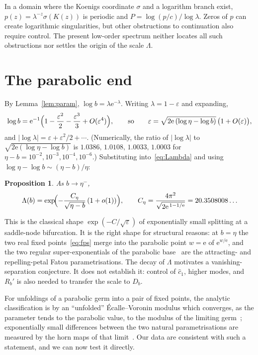 \documentclass[11pt,a4paper]{article}
\newtheorem{proposition}[theorem]{Proposition}
\theoremstyle{definition}
\newcommand{\Rr}{R}
\newcommand{\Kk}{K}
\newcommand{\eee}{\mathrm{e}}
\begin{document}
In a domain where the Koenigs coordinate $\sigma$ and a logarithm branch
exist, $p(z)=\lambda^{-z}\sigma(\Kk(z))$ is periodic and
$P=\log(p/c)/\log\lambda$.  Zeros of $p$ can create logarithmic
singularities, but other obstructions to continuation also require control.
The present low-order spectrum neither locates all such obstructions nor
settles the origin of the scale $\Lambda$.

\section{The parabolic end}\label{sec:parabolic}

By Lemma~\ref{lem:param}, $\log b=\lambda\eee^{-\lambda}$.  Writing
$\lambda=1-\varepsilon$ and expanding,
\[
  \log b=\eee^{-1}\Bigl(1-\frac{\varepsilon^{2}}{2}-\frac{\varepsilon^{3}}{3}
  +O(\varepsilon^{4})\Bigr),
  \qquad\text{so}\qquad
  \varepsilon=\sqrt{2\eee\,(\log\eta-\log b)}\,\bigl(1+O(\varepsilon)\bigr),
\]
and $|\log\lambda|=\varepsilon+\varepsilon^{2}/2+\cdots$.  (Numerically, the
ratio of $|\log\lambda|$ to $\sqrt{2\eee(\log\eta-\log b)}$ is
$1.0386,\,1.0108,\,1.0033,\,1.0003$ for
$\eta-b=10^{-2},10^{-3},10^{-4},10^{-6}$.)  Substituting into~\eqref{eq:Lambda}
and using $\log\eta-\log b\sim(\eta-b)/\eta$:

\begin{proposition}\label{prop:saddle}
As $b\to\eta^{-}$,
\begin{equation}\label{eq:saddle}
  \Lambda(b)=\exp\!\Bigl(-\frac{C_\eta}{\sqrt{\eta-b}}\,(1+o(1))\Bigr),
  \qquad
  C_\eta=\frac{4\pi^{2}}{\sqrt{2\eee^{\,1-1/\eee}}}=20.3508008\ldots
\end{equation}
\end{proposition}

This is the classical shape $\exp(-C/\sqrt{\varepsilon})$ of exponentially small
splitting at a saddle-node bifurcation.  It is the right shape for structural
reasons: at $b=\eta$ the two real fixed points~\eqref{eq:fps} merge into the
parabolic point $w=\eee$ of $\eee^{w/\eee}$, and the two regular
super-exponentials of the parabolic base~\cite{KouznetsovTrappmann2012} are the
attracting- and repelling-petal Fatou parametrisations.  The decay of $\Lambda$ motivates a vanishing-separation conjecture.  It does
not establish it: control of $\hat c_1$, higher modes, and $\Rr_b'$ is
also needed to transfer the scale to $D_b$.

For unfoldings of a parabolic germ into a pair of fixed points, the analytic
classification is by an ``unfolded'' \'Ecalle--Voronin modulus which converges,
as the parameter tends to the parabolic value, to the modulus of the limiting
germ~\cite{MRR2004,RousseauTeyssier2008}; exponentially small differences
between the two natural parametrisations are measured by the horn maps of that
limit~\cite{Ecalle1981,Voronin1981,Lavaurs1989,Shishikura2000,Oudkerk1999}.
Our data are consistent with such a statement, and we can now test it directly.
\end{document}
